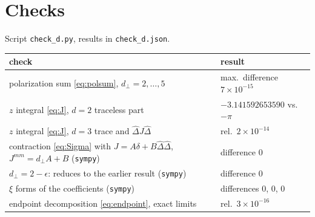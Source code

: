 \documentclass[10pt]{article}
\numberwithin{equation}{section}
\newcommand{\Dh}{\hat\Delta}
\begin{document}
\section{Checks}
Script \texttt{check\_d.py}, results in \texttt{check\_d.json}.
\begin{center}\small
\begin{tabular}{@{}p{}p{}@{}}\toprule
check & result\\\midrule
polarization sum \eqref{eq:polsum}, $d_\perp=2,\dots,5$ & max.\ difference $7\times10^{-15}$\\
$z$ integral \eqref{eq:J}, $d=2$ traceless part & $-3.141592653590$ vs.\ $-\pi$\\
$z$ integral \eqref{eq:J}, $d=3$ trace and $\Dh J\Dh$ & rel.\ $2\times10^{-14}$\\
contraction \eqref{eq:Sigma} with $J=A\delta+B\Dh\Dh$, $J^{mm}=d_\perp A+B$ (\texttt{sympy}) & difference $0$\\
$d_\perp=2-\epsilon$: reduces to the earlier result (\texttt{sympy}) & difference $0$\\
$\xi$ forms of the coefficients (\texttt{sympy}) & differences $0$, $0$, $0$\\
endpoint decomposition \eqref{eq:endpoint}, exact limits & rel.\ $3\times10^{-16}$\\\bottomrule
\end{tabular}
\end{center}
\end{document}
